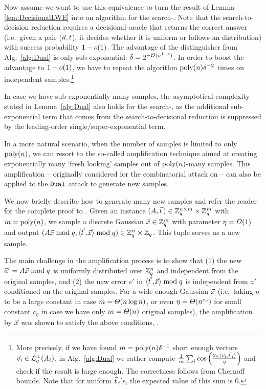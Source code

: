 Now assume we want to use this equivalence to turn the result of Lemma \ref{lem:DecisionalLWE} into an algorithm for the search-\LWE. Note that the search-to-decision reduction requires a decisional-\LWE oracle that returns the correct answer (i.e.\ given a pair ($\vec a, t$), it decides whether it is uniform or follows an \LWE distribution) with success probability $1-o(1)$. The advantage of the distinguisher from Alg.~\ref{alg:Dual} is only sub-exponential: $\delta = 2^{-\mathcal{O}(n^{1-\varepsilon})}$. In order to boost the advantage to $1-o(1)$, we have to repeat the algorithm $\mathrm{poly}(n) \delta^{-2}$ times on independent \LWE samples.\footnote{More precisely, if we have found $m = \mathrm{poly}(n) \delta^{-1}$ short enough vectors $\vvec_i \in \qLATTp (\AMat_i)$, in Alg.~\ref{alg:Dual} we rather compute $\tfrac{1}{m}\sum_i \cos \left( \frac{ 2 \pi \langle{\vvec_i},{\tvec_i}\rangle} {q} \right) $ and check if the result is large enough. The correctness follows from Chernoff bounds. Note that for uniform $\tvec_i$'s, the expected value of this sum is 0.} 

In case we have sub-exponentially many \LWE samples, the asymptotical complexity stated in Lemma~\ref{alg:Dual} also holds for the search-\LWE, as the additional sub-exponential term that comes from the search-to-decisional reduction is suppressed by the leading-order single/super-exponential term. 

In a more natural scenario, when the number of \LWE samples is limited to only $\mathrm{poly}(n)$, we can resort to the so-called amplification technique aimed at creating exponentially many `fresh looking' \LWE samples out of $\mathrm{poly}(n)$-many samples. This amplification -- originally considered for the combinatorial \BKW attack on \LWE \cite{DCC:ACFFP15} -- can also be applied to the $\texttt{Dual}$ attack to generate new samples. 

We now briefly describe how to generate many new samples and refer the reader for the complete proof to \cite{DCC:HKM}. Given an \LWE instance $(\AMat, \tvec) \in \Z_q^{n \times m} \times \Z_q^m$ with $m = \mathrm{poly}(n)$, we sample a discrete Gaussian $\vec x \in {{\mathbb Z}}_q^m$ with parameter $\eta = \varOmega(1)$ and output $(\AMat \xvec \bmod q, \ScProd{\tvec}{\xvec} \bmod q) \in \Z_q^n \times \Z_q$. This tuple serves as a new \LWE sample. 

 
The main challenge in the amplification process is to show that (1) the new $\vec a' = A \vec x \bmod q$ is uniformly distributed over ${{\mathbb Z}}_q^n$ and independent from the original samples, and (2) the new error $e'$ in $\ScProd{\tvec}{\xvec} \bmod q$ is independent from $a'$ conditioned on the original samples. For a wide enough Gaussian $\vec x$ (i.e.\ taking $\eta$ to be a large constant in case $m = \varTheta(n \log n)$, or even $\eta = \varTheta(n^{c_{\eta}})$ for small constant $c_{\eta}$ in case we have only $m = \varTheta(n)$ original samples), the amplification by $\vec x$ was shown to satisfy the above conditions, \cite{DCC:HKM}. 


